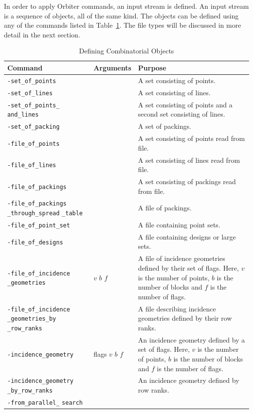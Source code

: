In order to apply Orbiter commands, an input stream is defined. 
An input stream is a sequence of objects, all of the same kind. 
The objects can be defined using any of the commands listed in Table~\ref{tab:combinatorial:objects}.
The file types will be discussed in more detail in the next section.
\begin{table}
	\begin{center}
	\begin{tabular}{|p{4cm}|p{3cm}|p{7cm}|}
		\hline
		Command & Arguments & Purpose \\
		\hline
		\hline
		\verb'-set_of_points' &  & A set consisting of points.  \\
		\hline
		\verb'-set_of_lines' &  & A set consisting of lines.  \\
		\hline
		\verb'-set_of_points_' \verb'and_lines' &  & A set consisting of points and a second set consisting of lines.  \\
		\hline
		\verb'-set_of_packing' &  &  A set of packings. \\
		\hline
		\verb'-file_of_points' &  &  A set consisting of points read from file. \\
		\hline
		\verb'-file_of_lines' &  &  A set consisting of lines read from file. \\
		\hline
		\verb'-file_of_packings' &  &   A set consisting of packings read from file. \\
		\hline
		\verb'-file_of_packings' \verb'_through_spread' \verb'_table' &  & A file of packings.  \\
		\hline
		\verb'-file_of_point_set' &  & A file containing point sets.  \\
		\hline
		\verb'-file_of_designs' &  &  A file containing designs or large sets. \\
		\hline
		\verb'-file_of_incidence' \verb'_geometries' & $v$ $b$ $f$ &  
		A file of incidence geometries defined by their set of flags. 
		Here, $v$ is the number of points, $b$ is the number of blocks and $f$ is the number of flags.\\
		\hline
		\verb'-file_of_incidence' \verb'_geometries_by' \verb'_row_ranks' &  &  A file describing incidence geometries defined by their row ranks. \\
		\hline
		\verb'-incidence_geometry' & flags $v$ $b$ $f$  & An incidence geometry defined by a set of flags. 
		Here, $v$ is the number of points, $b$ is the number of blocks and $f$ is the number of flags.\\
		\hline
		\verb'-incidence_geometry' \verb'_by_row_ranks' &  & An incidence geometry defined by row ranks. \\
		\hline
		\verb'-from_parallel_' \verb'search' &  &   \\
		\hline
		\end{tabular}
	\end{center}
	\caption{\label{tab:combinatorial:objects}Defining Combinatorial Objects}
\end{table}

